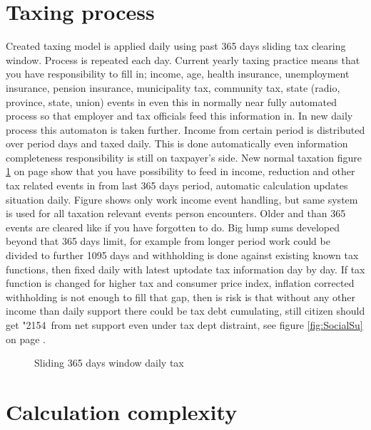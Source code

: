 \section{Taxing process}
\label{tax_process}
Created taxing model is applied daily using past 365 days sliding tax clearing
window. Process is repeated each day. Current yearly taxing practice means
that you have responsibility to fill in; income, age, health insurance,
unemployment insurance, pension insurance, municipality tax, community tax,
state (radio, province, state, union) events in even this in normally near
fully automated process so that employer and tax officials feed this
information in. In new daily process this automaton is taken further. Income
from certain period is distributed over period days and taxed daily. This is
done automatically even information completeness responsibility is still on
taxpayer's side. New normal taxation figure \ref{fig:taxing} on page
\pageref{fig:taxing} show that you have possibility to feed in income,
reduction and other tax related events in from last 365 days period, automatic
calculation updates situation daily.
Figure shows only work income event handling, but same system is used for all
taxation relevant events person encounters. Older and than 365 events are
cleared like if you have forgotten to do. Big lump sums developed beyond that
365 days limit, for example from longer period work could be divided to
further 1095 days and withholding is done against existing known tax
functions, then fixed daily with latest up\-to\-date tax information day by
day. If tax function is changed for higher tax and consumer price index,
inflation corrected withholding is not enough to fill that gap, then is risk
is that without any other income than daily support there could be tax debt
cumulating, still citizen should get \char"2154~from net support even under
tax dept distraint, see figure \ref{fig:SocialSu} on page
\pageref{fig:SocialSu}.
\begin{figure} %
 \begin{center}
  \caption{Sliding 365 days window daily tax}
  \label{fig:taxing} 
 \end{center}
\end{figure}

\section{Calculation complexity}
\label{calculation_complexity}


